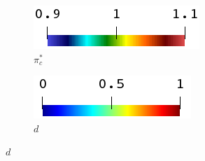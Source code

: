 \begin{figure}[!htb]
    \begin{subfigure}[b]{0.15\textwidth}
        \caption*{$\pi_c^*$}
        \includegraphics[width=\textwidth]{colorbar/rainbow_horizontal.png}
    \end{subfigure}
    \begin{subfigure}[b]{0.15\textwidth}
        \caption*{$d$}
        \includegraphics[width=\textwidth]{colorbar/jet_horizontal.png}
    \end{subfigure}


\end{figure}
